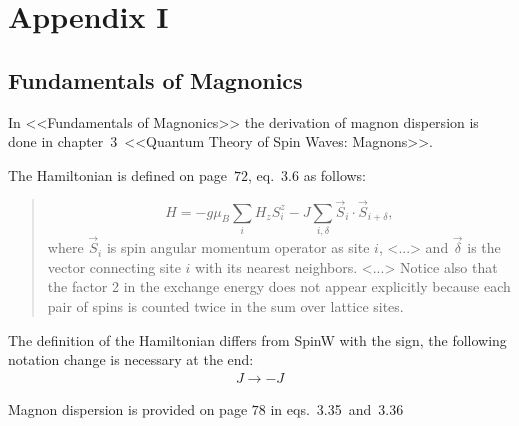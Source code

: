 \section{Appendix I}

\subsection{Fundamentals of Magnonics \cite{rezende2020fundamentals}}

    In <<Fundamentals of Magnonics>> the derivation of magnon dispersion is done in chapter~$3$~<<Quantum Theory of Spin Waves: Magnons>>.

    The Hamiltonian is defined on page~$72$, eq.~3.6 as follows:

    \begin{quote}
        \begin{equation}
            H = -g\mu_B\sum_iH_zS_i^z - J\sum_{i, \delta}\vec{S}_i \cdot \vec{S}_{i+\delta}, \label{eq:fom-3.6} \tag{3.6}
        \end{equation}
        where $\vec{S}_i$ is spin angular momentum operator as site $i$, <...> and $\vec{\delta}$ is the vector connecting site $i$ with its nearest neighbors. 
        <...> Notice also that the factor 2 in the exchange energy does not appear explicitly because each pair of spins is counted twice in the sum over lattice sites.
    \end{quote}

    The definition of the Hamiltonian differs from SpinW with the sign, the following notation change is necessary at the end:
    \begin{equation}
        \begin{matrix} 
            J \rightarrow -J
        \end{matrix}
    \end{equation}

    Magnon dispersion is provided on page $78$ in eqs.~3.35~and~3.36


